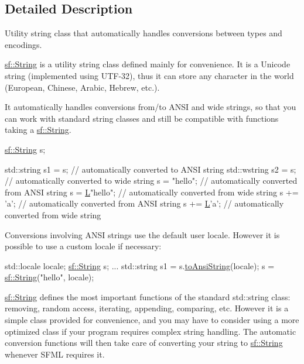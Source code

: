 \subsection{Detailed Description}
Utility string class that automatically handles conversions between types and encodings. 

\hyperlink{classsf_1_1_string}{sf\-::\-String} is a utility string class defined mainly for convenience. It is a Unicode string (implemented using U\-T\-F-\/32), thus it can store any character in the world (European, Chinese, Arabic, Hebrew, etc.).

It automatically handles conversions from/to A\-N\-S\-I and wide strings, so that you can work with standard string classes and still be compatible with functions taking a \hyperlink{classsf_1_1_string}{sf\-::\-String}.


\begin{DoxyCode}
\hyperlink{classsf_1_1_string}{sf::String} s;

std::string s1 = s;  \textcolor{comment}{// automatically converted to ANSI string}
std::wstring s2 = s; \textcolor{comment}{// automatically converted to wide string}
s = \textcolor{stringliteral}{"hello"};         \textcolor{comment}{// automatically converted from ANSI string}
s = \hyperlink{curses_8priv_8h_af9a835425a30133a9ab9c5c9b81906a6}{L}\textcolor{stringliteral}{"hello"};        \textcolor{comment}{// automatically converted from wide string}
s += \textcolor{charliteral}{'a'};            \textcolor{comment}{// automatically converted from ANSI string}
s += \hyperlink{curses_8priv_8h_af9a835425a30133a9ab9c5c9b81906a6}{L}\textcolor{charliteral}{'a'};           \textcolor{comment}{// automatically converted from wide string}
\end{DoxyCode}


Conversions involving A\-N\-S\-I strings use the default user locale. However it is possible to use a custom locale if necessary\-: 
\begin{DoxyCode}
std::locale locale;
\hyperlink{classsf_1_1_string}{sf::String} s;
...
std::string s1 = s.\hyperlink{classsf_1_1_string_a71d111ccfaf295b8b8be8ca4a3ceb5f4}{toAnsiString}(locale);
s = \hyperlink{classsf_1_1_string}{sf::String}(\textcolor{stringliteral}{"hello"}, locale);
\end{DoxyCode}


\hyperlink{classsf_1_1_string}{sf\-::\-String} defines the most important functions of the standard std\-::string class\-: removing, random access, iterating, appending, comparing, etc. However it is a simple class provided for convenience, and you may have to consider using a more optimized class if your program requires complex string handling. The automatic conversion functions will then take care of converting your string to \hyperlink{classsf_1_1_string}{sf\-::\-String} whenever S\-F\-M\-L requires it.

